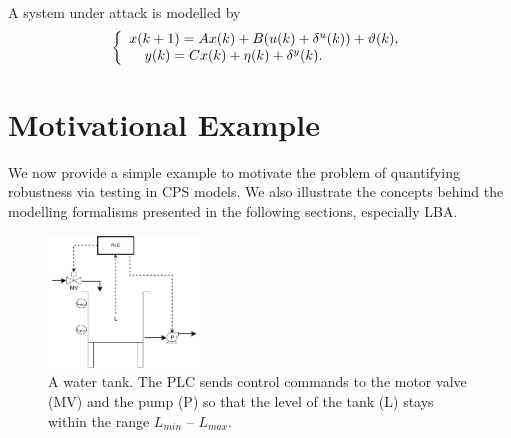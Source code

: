 {%
A system under attack is modelled by
\begin{equation}
\left\{
\begin{array}{ll}
{x}({k+1}) = A x(k) + B (u(k) + \delta^u(k)) + \vartheta(k),\label{17} \\
\text{ \ \ }\hspace{.35mm}{y}(k) = C x(k) + \eta(k) + \delta^y(k).
\end{array}
\right.
\end{equation}
}
\section{Motivational Example}
\label{sec:example}
We now provide a simple example to motivate the problem of quantifying robustness via testing in CPS models. We also illustrate the concepts behind the modelling formalisms presented in the following sections, especially LBA.


\begin{figure}
  \centering
  \includegraphics[width=0.36\textwidth]{Figures/FillingTank.pdf}
  \caption{A water tank. The PLC sends control commands to the motor valve (MV) and the pump (P) so that the level of the tank (L) stays within the range $L_{min}$ -- $L_{max}$. }
  \label{fig:Motivational}
\end{figure}
